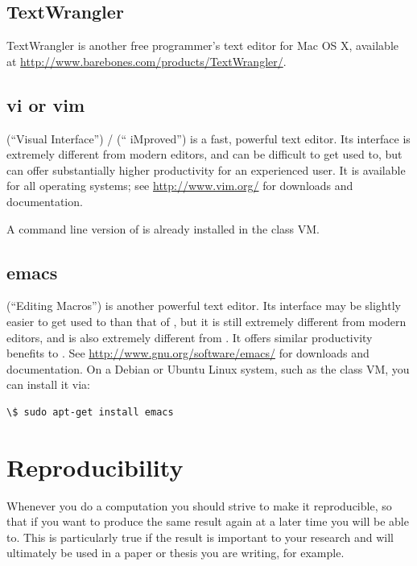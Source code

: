 \documentclass[letterpaper,10pt,english]{sphinxmanual}
\begin{document}
\subsection{TextWrangler}
\label{editors:textwrangler}
TextWrangler is another free programmer's text editor for Mac OS X,
available at \href{http://www.barebones.com/products/TextWrangler/}{http://www.barebones.com/products/TextWrangler/}.


\subsection{vi or vim}
\label{editors:vi-or-vim}
 (``Visual Interface'') /  (`` iMproved'') is a fast,
powerful text editor.  Its interface is extremely different from
modern editors, and can be difficult to get used to, but  can
offer substantially higher productivity for an experienced user.  It
is available for all operating systems; see \href{http://www.vim.org/}{http://www.vim.org/}
for downloads and documentation.

A command line version of  is already installed in the class VM.


\subsection{emacs}
\label{editors:emacs}
 (``Editing Macros'') is another powerful text editor.  Its
interface may be slightly easier to get used to than that of ,
but it is still extremely different from modern editors, and is also
extremely different from .  It offers similar productivity
benefits to .  See \href{http://www.gnu.org/software/emacs/}{http://www.gnu.org/software/emacs/} for
downloads and documentation.  On a Debian or Ubuntu Linux system, such
as the class VM, you can install it via:

\begin{Verbatim}[commandchars=\\\{\}]
\$ sudo apt-get install emacs
\end{Verbatim}


\section{Reproducibility}
\label{reproducibility:reproducibility}\label{reproducibility::doc}\label{reproducibility:id1}
Whenever you do a computation you should strive to make it reproducible, so
that if you want to produce the same result again at a later time you will
be able to.  This is particularly true if the result is important to
your research and will ultimately be used in a paper or thesis
you are writing, for example.
\end{document}

